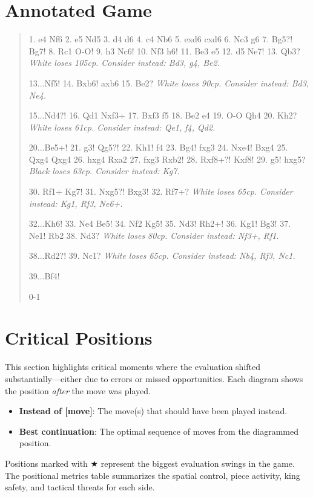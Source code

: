 \documentclass[11pt]{book}
\begin{document}
\section{Annotated Game}

\begin{quote}
1. e4 Nf6
2. e5 Nd5
3. d4 d6
4. c4 Nb6
5. exd6 cxd6
6. Nc3 g6
7. Bg5?! Bg7!
8. Rc1 O-O!
9. h3 Nc6!
10. Nf3 h6!
11. Be3 e5
12. d5 Ne7!
13. Qb3?
\textit{White loses 105cp. Consider instead: Bd3, g4, Be2.}

13...Nf5!
14. Bxb6! axb6
15. Be2?
\textit{White loses 90cp. Consider instead: Bd3, Ne4.}

15...Nd4?!
16. Qd1 Nxf3+
17. Bxf3 f5
18. Be2 e4
19. O-O Qh4
20. Kh2?
\textit{White loses 61cp. Consider instead: Qe1, f4, Qd2.}

20...Be5+!
21. g3! Qg5?!
22. Kh1! f4
23. Bg4! fxg3
24. Nxe4! Bxg4
25. Qxg4 Qxg4
26. hxg4 Rxa2
27. fxg3 Rxb2!
28. Rxf8+?! Kxf8!
29. g5! hxg5?
\textit{Black loses 63cp. Consider instead: Kg7.}

30. Rf1+ Kg7!
31. Nxg5?! Bxg3!
32. Rf7+?
\textit{White loses 65cp. Consider instead: Kg1, Rf3, Ne6+.}

32...Kh6!
33. Ne4 Be5!
34. Nf2 Kg5!
35. Nd3! Rh2+!
36. Kg1! Bg3!
37. Ne1! Rb2
38. Nd3?
\textit{White loses 80cp. Consider instead: Nf3+, Rf1.}

38...Rd2?!
39. Nc1?
\textit{White loses 65cp. Consider instead: Nb4, Rf3, Nc1.}

39...Bf4!

0-1
\end{quote}

\section{Critical Positions}

This section highlights critical moments where the evaluation shifted substantially---either due to errors or missed opportunities. Each diagram shows the position \emph{after} the move was played.

\begin{itemize}
\item \textbf{Instead of [move]}: The move(s) that should have been played instead.
\item \textbf{Best continuation}: The optimal sequence of moves from the diagrammed position.
\end{itemize}

Positions marked with {\color{blue}$\bigstar$} represent the biggest evaluation swings in the game. The positional metrics table summarizes the spatial control, piece activity, king safety, and tactical threats for each side.
\end{document}
